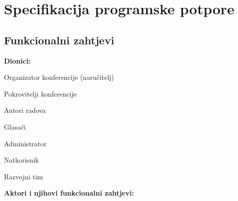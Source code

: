 \chapter{Specifikacija programske potpore}
		
	\section{Funkcionalni zahtjevi}
			
			\noindent \textbf{Dionici:}
			
			\begin{packed_enum}
				
				\item Organizator konferencije (naručitelj)
				\item Pokrovitelji konferencije
				\item Autori radova
				\item Glasači
				\item Administrator
				\item Natkorisnik
				\item Razvojni tim
				
			\end{packed_enum}
			
			\noindent \textbf{Aktori i njihovi funkcionalni zahtjevi:}
			
